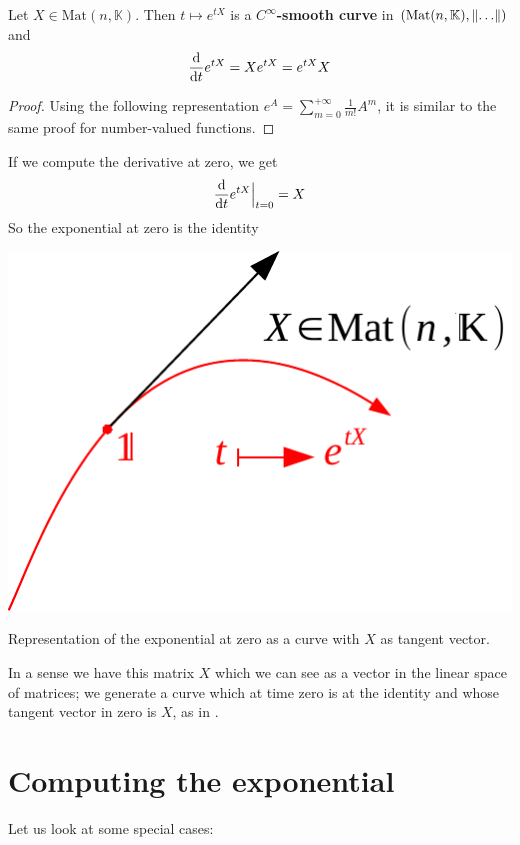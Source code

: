 \documentclass[../main.tex]{subfiles}
\begin{document}
\begin{proposition}
Let $X\in\textrm{Mat}(n,\mathbb{K})$. Then $t\mapsto e^{tX}$ is a $C^\infty$\textbf{-smooth curve} in $\left(\textrm{Mat}(n,\mathbb{K}),\norm{\dots}\right)$ and
\[
\dv{}{t}e^{tX}=Xe^{tX}=e^{tX}X
\]
\end{proposition}
\begin{proof}
Using the following representation $e^A=\sum_{m=0}^{+\infty}\frac{1}{m!}A^m$, it is similar to the same proof for number-valued functions.
\end{proof}
\begin{corollary}
If we compute the derivative at zero, we get
\[
\dv{}{t}e^{tX}\Big|_{t=0}=X
\]
So the exponential at zero is the identity
\end{corollary}
\begin{marginfigure}
	\includegraphics[width=1\linewidth]{images/derivata-exp.pdf}
	\caption{Representation of the exponential at zero as a curve with $X$ as tangent vector.}
\end{marginfigure}
In a sense we have this matrix $X$ which we can see as a vector in the linear space of matrices; we generate a curve which at time zero is at the identity and whose tangent vector in zero is $X$, as in .
\section{Computing the exponential}
Let us look at some special cases:
\end{document}
